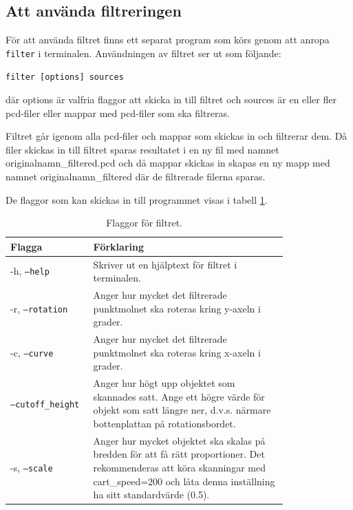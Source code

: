 \documentclass[a4paper,titlepage,12pt]{article}
\begin{document}
	\subsection{Att använda filtreringen}
	\label{sec:filtrering}
	För att använda filtret finns ett separat program som körs genom att anropa \texttt{filter} i terminalen. Användningen av filtret ser ut som följande:
	
	\texttt{filter [options] sources}
	
	där options är valfria flaggor att skicka in till filtret och sources är en eller fler pcd-filer eller mappar med pcd-filer som ska filtreras.
	
	Filtret går igenom alla pcd-filer och mappar som skickas in och filtrerar dem. Då filer skickas in till filtret sparas resultatet i en ny fil med namnet originalnamn\_filtered.pcd och då mappar skickas in skapas en ny mapp med namnet originalnamn\_filtered där de filtrerade filerna sparas.
	
	De flaggor som kan skickas in till programmet visas i tabell \ref{tab:filter_flaggor}.
	
	\begin{table}[H]
		\centering
		\caption{Flaggor för filtret.}
		\label{tab:filter_flaggor}
		
		\begin{tabular}{p{0.2\linewidth}p{0.6\linewidth}}
			Flagga & Förklaring \\
			\hline
			-h, \texttt{--help} & Skriver ut en hjälptext för filtret i terminalen. \\
			\hline
			-r, \texttt{--rotation} & Anger hur mycket det filtrerade punktmolnet ska roteras kring y-axeln i grader. \\
			\hline
			-c, \texttt{--curve} & Anger hur mycket det filtrerade punktmolnet ska roteras kring x-axeln i grader. \\
			\hline
			\texttt{--cutoff\_height} & Anger hur högt upp objektet som skannades satt. Ange ett högre värde för objekt som satt längre ner, d.v.s. närmare bottenplattan på rotationsbordet. \\
			\hline
			-s, \texttt{--scale} & Anger hur mycket objektet ska skalas på bredden för att få rätt proportioner. Det rekommenderas att köra skanningar med cart\_speed=200 och låta denna inställning ha sitt standardvärde (0.5). \\
			\hline
		\end{tabular}
	
	\end{table}
\end{document}
